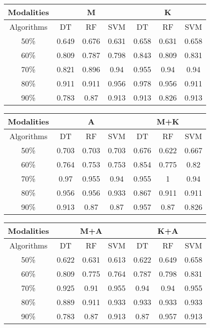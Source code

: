 \begin{table}[h]
\begin{tabular}{|c|c|c|c|c|c|c|}
\hline
Modalities & \multicolumn{3}{c|}{M} & \multicolumn{3}{c|}{K} \\ \hline
Algorithms & DT     & RF    & SVM   & DT     & RF    & SVM   \\ \hline
50\%       & 0.649  & 0.676 & 0.631 & 0.658  & 0.631 & 0.658 \\ \hline
60\%       & 0.809  & 0.787 & 0.798 & 0.843  & 0.809 & 0.831 \\ \hline
70\%       & 0.821  & 0.896 & 0.94  & 0.955  & 0.94  & 0.94  \\ \hline
80\%       & 0.911  & 0.911 & 0.956 & 0.978  & 0.956 & 0.911 \\ \hline
90\%       & 0.783  & 0.87  & 0.913 & 0.913  & 0.826 & 0.913 \\ \hline
\end{tabular}
\end{table}

\begin{table}[h]
\begin{tabular}{|c|c|c|c|c|c|c|}
\hline
Modalities & \multicolumn{3}{c|}{A} & \multicolumn{3}{c|}{M+K} \\ \hline
Algorithms & DT     & RF    & SVM   & DT     & RF     & SVM    \\ \hline
50\%       & 0.703  & 0.703 & 0.703 & 0.676  & 0.622  & 0.667  \\ \hline
60\%       & 0.764  & 0.753 & 0.753 & 0.854  & 0.775  & 0.82   \\ \hline
70\%       & 0.97   & 0.955 & 0.94  & 0.955  & 1      & 0.94   \\ \hline
80\%       & 0.956  & 0.956 & 0.933 & 0.867  & 0.911  & 0.911  \\ \hline
90\%       & 0.913  & 0.87  & 0.87  & 0.957  & 0.87   & 0.826  \\ \hline
\end{tabular}
\end{table}

\begin{table}[h]
\begin{tabular}{|c|c|c|c|c|c|c|}
\hline
Modalities & \multicolumn{3}{c|}{M+A} & \multicolumn{3}{c|}{K+A} \\ \hline
Algorithms & DT     & RF     & SVM    & DT     & RF     & SVM    \\ \hline
50\%       & 0.622  & 0.631  & 0.613  & 0.622  & 0.649  & 0.658  \\ \hline
60\%       & 0.809  & 0.775  & 0.764  & 0.787  & 0.798  & 0.831  \\ \hline
70\%       & 0.925  & 0.91   & 0.955  & 0.94   & 0.94   & 0.955  \\ \hline
80\%       & 0.889  & 0.911  & 0.933  & 0.933  & 0.933  & 0.933  \\ \hline
90\%       & 0.783  & 0.87   & 0.913  & 0.87   & 0.957  & 0.913  \\ \hline
\end{tabular}
\end{table}

